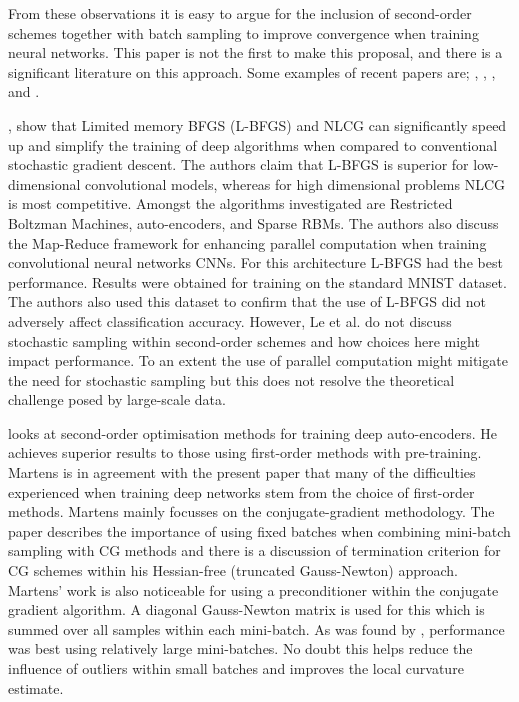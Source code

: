 \documentclass[11pt,twocolumn]{article}
\begin{document}
From these observations it is easy to argue for the inclusion of second-order schemes together with batch sampling to improve convergence when training neural networks. This paper is not the first to make this proposal, and there is a significant literature on this approach. Some examples of recent papers are;  \citet{Asi:BetterStoch}, \citet{Le:OptDeep}, \citet{Martens:Deep}, \citet{Xu:2ndNCML} and  \citet{Zhao:SLBFGS}.

\citet{Le:OptDeep}, show that Limited memory BFGS (L-BFGS) and NLCG can significantly speed up and simplify the training of deep algorithms when compared to conventional stochastic gradient descent. The authors claim that L-BFGS is superior for low-dimensional convolutional models, whereas for high dimensional problems NLCG is most competitive. Amongst the algorithms investigated are Restricted Boltzman Machines, auto-encoders, and Sparse RBMs. The authors also discuss the Map-Reduce framework for enhancing parallel computation when training convolutional neural networks CNNs. For this architecture L-BFGS had the best performance. Results were obtained for training on the standard MNIST dataset. The authors also used this dataset to confirm that the use of L-BFGS did not adversely affect classification accuracy. However, Le et al. do not discuss stochastic sampling within second-order schemes and how choices here might impact performance. To an extent the use of parallel computation might mitigate the need for stochastic sampling but this does not resolve the theoretical challenge posed by large-scale data.

\citet{Martens:Deep} looks at second-order optimisation methods for training deep auto-encoders. He achieves superior results to those using first-order methods with pre-training. Martens is in agreement with the present paper that many of the difficulties experienced when training deep networks stem from the choice of first-order methods. Martens mainly focusses on the conjugate-gradient methodology. The paper describes the importance of using fixed batches when combining mini-batch sampling with CG methods and there is a discussion of termination criterion for CG schemes within his Hessian-free (truncated Gauss-Newton) approach. Martens' work is also noticeable for using a preconditioner within the conjugate gradient algorithm. A diagonal Gauss-Newton matrix is used for this which is summed over all samples within each mini-batch. As was found by \citet{Le:OptDeep}, performance was best using relatively large mini-batches. No doubt this helps reduce the influence of outliers within small batches and improves the local curvature estimate.
\end{document}
